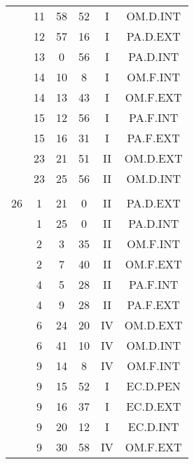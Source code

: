 \documentclass[12pt, a4paper]{article}
\begin{document}
\begin{multicols}{3}
{\begin{tabular}{c c c c c c}
	 	 	 	 & 11 & 58 & 52 & I & OM.D.INT\\%
	 	 	 	 & 12 & 57 & 16 & I & PA.D.EXT\\%
	 	 	 	 & 13 & 0 & 56 & I & PA.D.INT\\%
	 	 	 	 & 14 & 10 & 8 & I & OM.F.INT\\%
	 	 	 	 & 14 & 13 & 43 & I & OM.F.EXT\\%
	 	 	 	 & 15 & 12 & 56 & I & PA.F.INT\\%
	 	 	 	 & 15 & 16 & 31 & I & PA.F.EXT\\%
	 	 	 	 & 23 & 21 & 51 & II & OM.D.EXT\\%
	 	 	 	 & 23 & 25 & 56 & II & OM.D.INT\\%
	 	 	 	 & & & & & \\%
	 	 	 	26 & 1 & 21 & 0 & II & PA.D.EXT\\%
	 	 	 	 & 1 & 25 & 0 & II & PA.D.INT\\%
	 	 	 	 & 2 & 3 & 35 & II & OM.F.INT\\%
	 	 	 	 & 2 & 7 & 40 & II & OM.F.EXT\\%
	 	 	 	 & 4 & 5 & 28 & II & PA.F.INT\\%
	 	 	 	 & 4 & 9 & 28 & II & PA.F.EXT\\%
	 	 	 	 & 6 & 24 & 20 & IV & OM.D.EXT\\%
	 	 	 	 & 6 & 41 & 10 & IV & OM.D.INT\\%
	 	 	 	 & 9 & 14 & 8 & IV & OM.F.INT\\%
	 	 	 	 & 9 & 15 & 52 & I & EC.D.PEN\\%
	 	 	 	 & 9 & 16 & 37 & I & EC.D.EXT\\%
	 	 	 	 & 9 & 20 & 12 & I & EC.D.INT\\%
	 	 	 	 & 9 & 30 & 58 & IV & OM.F.EXT\\%

\end{tabular}}
\end{multicols}
\end{document}

